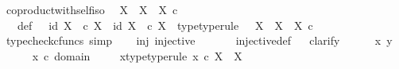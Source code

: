 \begin{isabellebody}
\endisatagproof
{\isafoldproof}%
%
\isadelimproof
\isanewline
%
\endisadelimproof
\isanewline
{}\isamarkupfalse%
\ coproduct{\isacharunderscore}{\kern0pt}with{\isacharunderscore}{\kern0pt}self{\isacharunderscore}{\kern0pt}iso{\isacharcolon}{\kern0pt}\isanewline
\ \ {\isachardoublequoteopen}X\ {\isasymCoprod}\ X\ {\isasymcong}\ X\ {\isasymtimes}\isactrlsub c\ {\isasymOmega}{\isachardoublequoteclose}\isanewline
%
\isadelimproof
%
\endisadelimproof
%
\isatagproof
{}\isamarkupfalse%
\ {\isacharminus}{\kern0pt}\ \isanewline
\ \ \isamarkupfalse%
\ {\isasymrho}\ \ {\isasymrho}{\isacharunderscore}{\kern0pt}def{\isacharcolon}{\kern0pt}\ {\isachardoublequoteopen}{\isasymrho}\ {\isacharequal}{\kern0pt}\ {\isasymlangle}id\ X{\isacharcomma}{\kern0pt}\ {\isasymt}\ {\isasymcirc}\isactrlsub c\ {\isasymbeta}\isactrlbsub X\isactrlesub {\isasymrangle}\ {\isasymamalg}\ {\isasymlangle}id\ X{\isacharcomma}{\kern0pt}\ {\isasymf}\ {\isasymcirc}\isactrlsub c\ {\isasymbeta}\isactrlbsub X\isactrlesub {\isasymrangle}{\isachardoublequoteclose}\ \ {\isasymrho}{\isacharunderscore}{\kern0pt}type{\isacharbrackleft}{\kern0pt}type{\isacharunderscore}{\kern0pt}rule{\isacharbrackright}{\kern0pt}{\isacharcolon}{\kern0pt}\ {\isachardoublequoteopen}{\isasymrho}\ {\isacharcolon}{\kern0pt}\ X\ {\isasymCoprod}\ X\ {\isasymrightarrow}\ X\ {\isasymtimes}\isactrlsub c\ {\isasymOmega}{\isachardoublequoteclose}\isanewline
\ \ \ \ \isamarkupfalse%
\ {\isacharparenleft}{\kern0pt}typecheck{\isacharunderscore}{\kern0pt}cfuncs{\isacharcomma}{\kern0pt}\ simp{\isacharparenright}{\kern0pt}\isanewline
\ \ \isamarkupfalse%
\ {\isasymrho}{\isacharunderscore}{\kern0pt}inj{\isacharcolon}{\kern0pt}\ {\isachardoublequoteopen}injective\ {\isasymrho}{\isachardoublequoteclose}\isanewline
\ \ \ \ \isamarkupfalse%
\ injective{\isacharunderscore}{\kern0pt}def\isanewline
\ \ \isamarkupfalse%
{\isacharparenleft}{\kern0pt}clarify{\isacharparenright}{\kern0pt}\isanewline
\ \ \ \ \isamarkupfalse%
\ x\ y\ \isanewline
\ \ \ \ \isamarkupfalse%
\ {\isachardoublequoteopen}x\ {\isasymin}\isactrlsub c\ domain\ {\isasymrho}{\isachardoublequoteclose}\ \isamarkupfalse%
\ \isamarkupfalse%
\ x{\isacharunderscore}{\kern0pt}type{\isacharbrackleft}{\kern0pt}type{\isacharunderscore}{\kern0pt}rule{\isacharbrackright}{\kern0pt}{\isacharcolon}{\kern0pt}\ {\isachardoublequoteopen}x\ {\isasymin}\isactrlsub c\ X\ {\isasymCoprod}\ X{\isachardoublequoteclose}\isanewline

\end{isabellebody}
